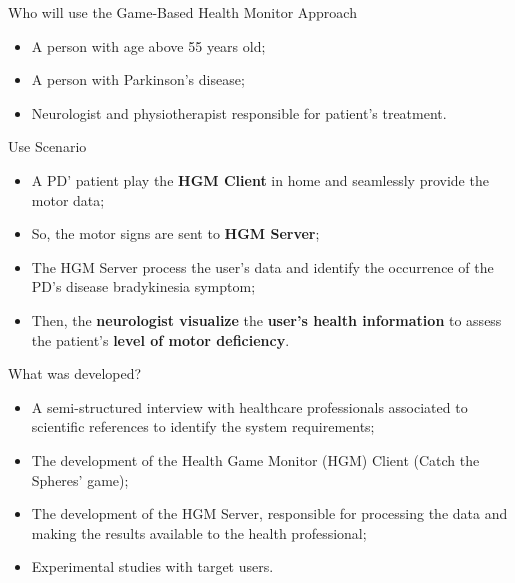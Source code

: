 \documentclass{beamer}
\begin{document}
%
\begin{frame}{Who will use the Game-Based Health Monitor Approach}
    \begin{block}{}
        \begin{itemize}[<+->]
            \item A person with age above 55 years old;
            \item A person with Parkinson's disease;
            \item Neurologist and physiotherapist responsible for patient's treatment.
        \end{itemize}
    \end{block}
\end{frame}


\begin{frame}{Use Scenario}
   \begin{block}{}
      \begin{itemize}[<+->]
       \item A PD' patient play the \textbf{HGM Client} in home and seamlessly provide the motor data;
       \item So, the motor signs are sent to \textbf{HGM Server};
       \item The HGM Server process the user's data and identify the occurrence of the PD's disease bradykinesia symptom;
       \item Then, the \textbf{neurologist visualize} the \textbf{user's health information} to assess the patient's \textbf{level of motor deficiency}.
      \end{itemize}
  \end{block}
\end{frame}



\begin{frame}{What was developed?}
    \begin{block}{}
        \begin{itemize}[<+->]
            \item  A semi-structured interview with healthcare professionals associated to scientific references to identify the system requirements;
            \item The development of the Health Game Monitor (HGM) Client (Catch the Spheres' game);
            \item The development of the HGM Server, responsible for processing the data and making the results available to the health professional;
						\item Experimental studies with target users.
        \end{itemize}
    \end{block}
\end{frame}
\end{document}
